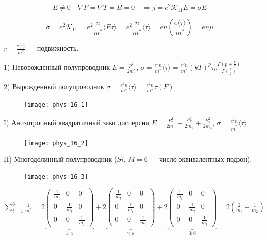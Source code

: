 $$E \neq 0 \quad \nabla F=\nabla T=\bar{B}=0 \quad \Rightarrow j=e^2 \mathcal{K}_{11} \bar{E}=\sigma \bar{E}$$

$$\sigma=e^2 \mathcal{K}_{11}=e^2 \frac{n}{m^*} \langle E \tau \rangle = e^2 \frac{n}{m^*} \langle \tau \rangle = en\left(\frac{e \langle \tau \rangle}{m ^*}\right)=en\mu$$

$r=\frac{e\langle\tau\rangle}{m^*}$ --- подвижность.


1) Неворожденный полупроводник $E=\frac{p^2}{2 m^*}$, $\sigma=\frac{e^2 n}{m^*}\langle\tau\rangle = \frac{e^2 n}{m^*}(k T)^p \tau_0 \frac{\Gamma\left(p+\frac{5}{2}\right)}{\Gamma\left(\frac{5}{2}\right)}$

2) Вырожденный полупроводник $\sigma=\frac{e^2 n}{m^*}\langle\tau\rangle = \frac{e^2 n}{m^*} \tau(F)$

\begin{figure}[h!]
    \centering
    \texttt{[image: phys\_16\_1]}
\end{figure}




I) Анизотропный квадратичный зако дисперсии $E=\frac{P_x^2}{2 m_1}+\frac{P_y^2}{2 m_2}+\frac{P_z^2}{2 m_3}$, $\sigma=\frac{e^2 n}{\tilde{m}^*}\langle\tau\rangle$
\begin{figure}[h!]
    \centering
    \texttt{[image: phys\_16\_2]}
\end{figure}


II) Многодолинный полупроводник ($Si$, $M=6$ --- число эквивалентных подзон).
\begin{figure}[h!]
    \centering
    \texttt{[image: phys\_16\_3]}
\end{figure}

$\displaystyle \sum_{i=1}^6 \frac{1}{m_i^*}=2\underbrace{\left(\begin{array}{ccc}\frac{1}{m_t} & 0 & 0 \\ 0 & \frac{1}{m_{t}} & 0 \\ 0 & 0 & \frac{1}{m_l}\end{array}\right)}_{1; 4}+2\underbrace{\left(\begin{array}{ccc}\frac{1}{m_l} & 0 & 0 \\ 0 & \frac{1}{m_t} & 0 \\ 0 & 0 & \frac{1}{m_t}\end{array}\right)}_{2; 5}+2\underbrace{\left(\begin{array}{ccc}\frac{1}{m_t} & 0 & 0 \\ 0 & \frac{1}{m_l} & 0 \\ 0 & 0 & \frac{1}{m_t}\end{array}\right)}_{3; 6}= 2\left(\frac{2}{m_t}+\frac{1}{m_2}\right)$

